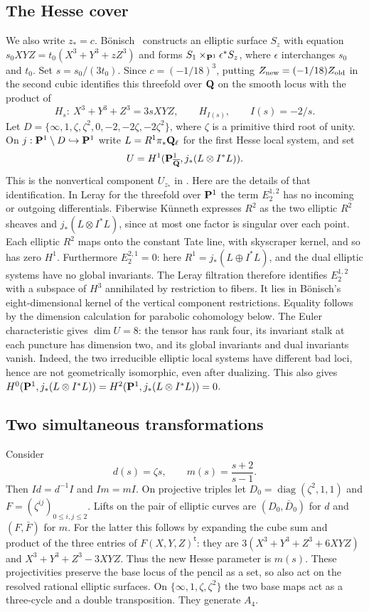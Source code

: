 \documentclass[11pt,letterpaper]{article}
\theoremstyle{definition}
\theoremstyle{remark}
\begin{document}
\subsection{The Hesse cover}
We also write $z_*=c$.
B\"onisch~\cite[\S5.1]{IV:bonisch} constructs an elliptic surface $S_z$ with
equation $s_0XYZ=t_0(X^3+Y^3+zZ^3)$ and forms
$S_1\times_{\mathbf P^1}\epsilon^*S_z$, where $\epsilon$ interchanges
$s_0$ and $t_0$. Set $s=s_0/(3t_0)$. Since $c=(-1/18)^3$,
putting $Z_{\rm new}=(-1/18)Z_{\rm old}$ in the second cubic
identifies this threefold over $\mathbf Q$ on the smooth locus with the product of
\[
 H_s:\ X^3+Y^3+Z^3=3sXYZ,\qquad H_{I(s)},\qquad I(s)=-2/s .
\]
Let $D=\{\infty,1,\zeta,\zeta^2,0,-2,-2\zeta,-2\zeta^2\}$, where
$\zeta$ is a primitive third root of unity. On
$j:\mathbf P^1\setminus D\hookrightarrow\mathbf P^1$ write $L=R^1\pi_*\mathbf Q_\ell$
for the first Hesse local system, and set
\begin{equation}\label{IV:eq:par}
 U=H^1(\mathbf P^1_{\overline{\mathbf Q}},j_*(L\otimes I^* L)).
\end{equation}
This is the nonvertical component $U_{z_*}$ in
\cite[\S\S4.3, 5.1]{IV:bonisch}. Here are the details of that
identification. In Leray for the threefold over $\mathbf P^1$ the term
$E_2^{1,2}$ has no incoming or outgoing differentials.
Fiberwise K\"unneth expresses $R^2$ as the two elliptic $R^2$
sheaves and $j_*(L\otimes I^*L)$, since at most one factor is
singular over each point. Each elliptic $R^2$ maps onto the
constant Tate line, with skyscraper kernel, and so has zero $H^1$.
Furthermore $E_2^{2,1}=0$: here $R^1=j_*(L\oplus I^*L)$, and the
dual elliptic systems have no global invariants. The Leray filtration
therefore identifies $E_2^{1,2}$ with a subspace of $H^3$ annihilated
by restriction to fibers. It lies in B\"onisch's eight-dimensional
kernel of the vertical component restrictions. Equality follows by
the dimension calculation for parabolic cohomology below. The
Euler characteristic gives $\dim U=8$: the tensor has rank
four, its invariant stalk at each puncture has dimension two, and its
global invariants and dual invariants vanish. Indeed, the two
irreducible elliptic local systems have different bad loci, hence are
not geometrically isomorphic, even after dualizing. This also gives
$H^0(\mathbf P^1,j_*(L\otimes I^*L))=H^2(\mathbf P^1,j_*(L\otimes I^*L))=0$.

\subsection{Two simultaneous transformations}
Consider
\[
 d(s)=\zeta s,\qquad m(s)=\frac{s+2}{s-1}.
\]
Then $I d=d^{-1} I$ and $I m=m I$. On projective triples let
$D_0=\operatorname{diag}(\zeta^2,1,1)$ and
$F=(\zeta^{ij})_{0\leq i,j\leq2}$.
Lifts on the pair of elliptic curves are $(D_0,\bar D_0)$ for $d$ and
$(F,\bar F)$ for $m$. For the latter this follows by expanding the cube
sum and product of the three entries of $F(X,Y,Z)^{\mathsf t}$:
they are $3(X^3+Y^3+Z^3+6XYZ)$ and $X^3+Y^3+Z^3-3XYZ$.
Thus the new Hesse parameter is $m(s)$.
These projectivities preserve the base locus of the pencil as a set, so
also act on the resolved rational elliptic surfaces.
On $\{\infty,1,\zeta,\zeta^2\}$ the two base maps act as a three-cycle
and a double transposition. They generate $A_4$.
\end{document}
